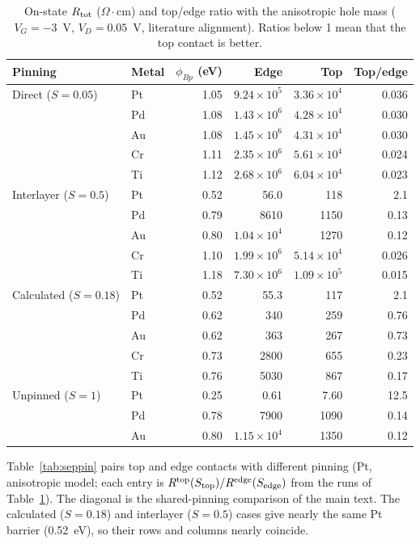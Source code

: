 \documentclass[11pt]{article}
\providecommand{\ohmcm}{\ensuremath{\Omega\cdot\mathrm{cm}}}
\providecommand{\ohmcm}{\ensuremath{\Omega\cdot\mathrm{cm}}}
\begin{document}
\begin{table}[!htbp]
\centering
\caption{On-state $R_{\rm tot}$ (\ohmcm) and top/edge ratio with the anisotropic hole mass ($V_G=-3$~V, $V_D=0.05$~V, literature alignment). Ratios below 1 mean that the top contact is better.}
\label{tab:anisometals}\small
\begin{tabular}{llrrrr}
\toprule
Pinning & Metal & $\phi_{Bp}$ (eV) & Edge & Top & Top/edge \\
\midrule
Direct ($S=0.05$) & Pt & 1.05 & $9.24\times10^5$ & $3.36\times10^4$ & 0.036 \\
 & Pd & 1.08 & $1.43\times10^6$ & $4.28\times10^4$ & 0.030 \\
 & Au & 1.08 & $1.45\times10^6$ & $4.31\times10^4$ & 0.030 \\
 & Cr & 1.11 & $2.35\times10^6$ & $5.61\times10^4$ & 0.024 \\
 & Ti & 1.12 & $2.68\times10^6$ & $6.04\times10^4$ & 0.023 \\
Interlayer ($S=0.5$) & Pt & 0.52 & 56.0 & 118 & 2.1 \\
 & Pd & 0.79 & 8610 & 1150 & 0.13 \\
 & Au & 0.80 & $1.04\times10^4$ & 1270 & 0.12 \\
 & Cr & 1.10 & $1.99\times10^6$ & $5.14\times10^4$ & 0.026 \\
 & Ti & 1.18 & $7.30\times10^6$ & $1.09\times10^5$ & 0.015 \\
Calculated ($S=0.18$) & Pt & 0.52 & 55.3 & 117 & 2.1 \\
 & Pd & 0.62 & 340 & 259 & 0.76 \\
 & Au & 0.62 & 363 & 267 & 0.73 \\
 & Cr & 0.73 & 2800 & 655 & 0.23 \\
 & Ti & 0.76 & 5030 & 867 & 0.17 \\
Unpinned ($S=1$) & Pt & 0.25 & 0.61 & 7.60 & 12.5 \\
 & Pd & 0.78 & 7900 & 1090 & 0.14 \\
 & Au & 0.80 & $1.15\times10^4$ & 1350 & 0.12 \\
\bottomrule
\end{tabular}
\end{table}

Table~\ref{tab:seppin} pairs top and edge contacts with different pinning (Pt, anisotropic model; each entry is $R^{\rm top}(S_{\rm top})/R^{\rm edge}(S_{\rm edge})$ from the runs of Table~\ref{tab:anisometals}). The diagonal is the shared-pinning comparison of the main text. The calculated ($S=0.18$) and interlayer ($S=0.5$) cases give nearly the same Pt barrier (0.52~eV), so their rows and columns nearly coincide.
\end{document}
